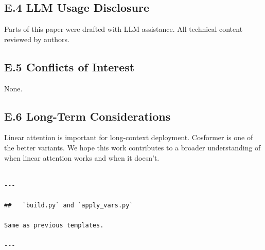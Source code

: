 \subsection{E.4 LLM Usage Disclosure}

Parts of this paper were drafted with LLM assistance. All technical content 
reviewed by authors.

\subsection{E.5 Conflicts of Interest}

None.

\subsection{E.6 Long-Term Considerations}

Linear attention is important for long-context deployment. Cosformer is one 
of the better variants. We hope this work contributes to a broader 
understanding of when linear attention works and when it doesn't.
\begin{lstlisting}

---

##   `build.py` and `apply_vars.py`

Same as previous templates.

---
\end{lstlisting}